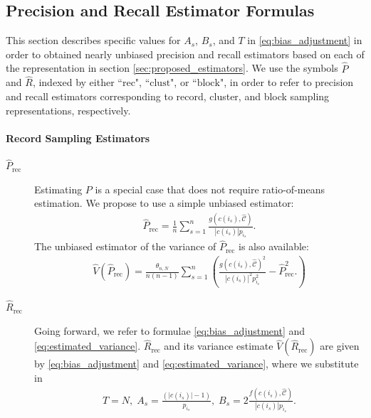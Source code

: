 \documentclass[fontsize=11pt]{article}
\theoremstyle{definition}
\begin{document}
\subsection{Precision and Recall Estimator Formulas} \label{sec:appendix_estimators}

This section describes specific values for $A_s$, $B_s$, and $T$ in \eqref{eq:bias_adjustment} in order to obtained nearly unbiased precision and recall estimators based on each of the representation in section \ref{sec:proposed_estimators}. We use the symbols $\widehat P$ and $\widehat R$, indexed by either ``$\text{rec}$", ``$\text{clust}$", or ``$\text{block}$", in order to refer to precision and recall estimators corresponding to record, cluster, and block sampling representations, respectively.

\paragraph{Record Sampling Estimators}

\begin{description}
    \item[$\widehat{P}_{\text{rec}}$]{Estimating $P$ is a special case that does not require ratio-of-means estimation. We propose to use a simple unbiased estimator:}
    \begin{align}\label{eq:P_rec}
        \widehat{P}_{\text{rec}} =
        \frac{1}{n}\sum_{s=1}^{n}\frac{g(c(i_s),\widehat{\mathcal{C}})}{|c(i_s)|p_{i_s}}.
    \end{align}
    The unbiased estimator of the variance of $\widehat{P}_{\text{rec}}$ is also available:
    \begin{align}
        \widehat{V}(\widehat{P}_{\text{rec}}) = 
        \frac{\theta_{n,N}}{n(n-1)}\sum_{s=1}^{n}\left(
        \frac{g(c(i_s),\widehat{\mathcal{C}})^2}{|c(i_s)|^2p_{i_s}^2} - 
        \widehat{P}_{\text{rec}}^2.
        \right)
    \end{align}
    \item[$\widehat{R}_{\text{rec}}$]{Going forward, we refer to formulae \eqref{eq:bias_adjustment} and \eqref{eq:estimated_variance}. $\widehat{R}_{\text{rec}}$ and its variance estimate $\widehat{V}(\widehat{R}_{\text{rec}})$ are given by \eqref{eq:bias_adjustment} and \eqref{eq:estimated_variance}, where we substitute in}
    \begin{align}
    T = N,\; A_s = \frac{(\lvert c(i_s) \rvert - 1)}{p_{i_s}},\; 
    B_s = 2\frac{f(c(i_s),\widehat{\mathcal{C}})}{|c(i_s)|p_{i_s}}.
    \end{align}
\end{description}
\end{document}

